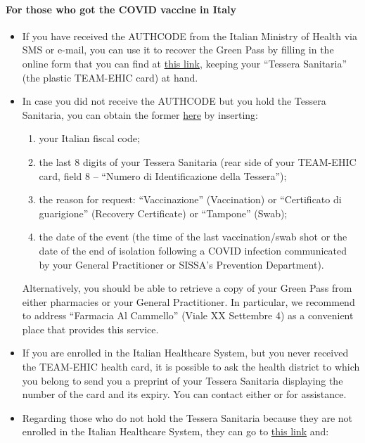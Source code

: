 \documentclass{sissavademecum}
\begin{document}
{\small
\begin{tcolorbox}[breakable, enhanced, sharp corners, colback=green!30, colframe=green!80!blue, title=Obtaining the Green Pass]
\paragraph{\small For those who got the COVID vaccine in Italy}
\begin{itemize}
    \item If you have received the AUTHCODE from the Italian Ministry of Health via SMS or e-mail, you can use it to recover the Green Pass by filling in the online form that you can find at \href{https://www.dgc.gov.it/spa/public/home}{this link}, keeping your ``Tessera Sanitaria'' (the plastic TEAM-EHIC card) at hand.
    \item In case you did not receive the AUTHCODE but you hold the Tessera Sanitaria, you can obtain the former \href{https://www.dgc.gov.it/spa/public/reqauth}{here} by inserting:
    \begin{enumerate}
        \item your Italian fiscal code;
        \item the last 8 digits of your Tessera Sanitaria (rear side of your TEAM-EHIC card, field 8 – ``Numero di Identificazione della Tessera'');
        \item the reason for request: ``Vaccinazione'' (Vaccination) or ``Certificato di guarigione'' (Recovery Certificate) or ``Tampone'' (Swab);
        \item the date of the event (the time of the last vaccination/swab shot or the date of the end of isolation following a COVID infection communicated by your General Practitioner or SISSA's Prevention Department).
    \end{enumerate}
    Alternatively, you should be able to retrieve a copy of your Green Pass from either pharmacies or your General Practitioner. In particular, we recommend to address ``Farmacia Al Cammello'' (Viale XX Settembre 4) as a convenient place that provides this service.
    \item If you are enrolled in the Italian Healthcare System, but you never received the TEAM-EHIC health card, it is possible to ask the health district to which you belong to send you a preprint of your Tessera Sanitaria displaying the number of the card and its expiry. You can contact either  or  for assistance.
    \item Regarding those who do not hold the Tessera Sanitaria because they are not enrolled in the Italian Healthcare System, they can go to \href{https://www.dgc.gov.it/spa/public/home}{this link} and:

\end{itemize}
\end{tcolorbox}}
\end{document}
